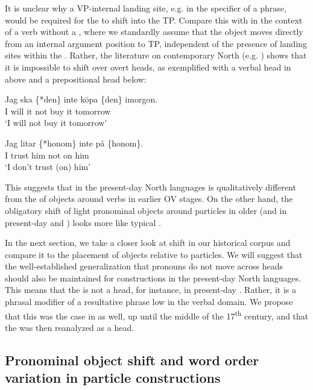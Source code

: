 \documentclass[output=paper]{langscibook}
\begin{document}
It is unclear why a VP-internal landing site, e.g. in the specifier of a  phrase, would be required for the  to shift into the TP. Compare this with  in the context of a verb without a , where we standardly assume that the object moves directly from an internal argument position to TP, independent of the presence of landing sites within the . Rather, the literature on contemporary North   (e.g. \citealt{Thrainsson2001}) shows that it is impossible to shift over overt heads, as exemplified with a verbal head in  above and a prepositional head below:


\ea\label{ex:lalu:50}
\ea
\gll Jag  ska  \{*den\}   inte   köpa   \{den\}   imorgon.\\
      I         will      it      not  buy     it     tomorrow \\
\glt  ‘I will not buy it tomorrow'

\ex
\gll Jag  litar   \{*honom\}   inte   på   \{honom\}.\\
    I     trust     him     not   on     him\\
\glt  ‘I don’t trust (on) him'
\z
\z


This suggests that  in the present-day North  languages is qualitatively different from the  of objects around verbs in earlier OV stages. On the other hand, the obligatory shift of light pronominal objects around particles in older  (and in present-day  and ) looks more like typical . 



In the next section, we take a closer look at  shift in our historical corpus and compare it to the placement of objects relative to particles. We will suggest that the well-established generalization that pronouns do not move across heads should also be maintained for  constructions in the present-day North  languages. This means that the  is not a head, for instance, in present-day . Rather, it is a phrasal modifier of a resultative phrase low in the verbal domain. We propose that this was the case in  as well, up until the middle of the 17\textsuperscript{th} century, and that the  was then reanalyzed as a head. 


\subsection{Pronominal object shift and word order variation in particle constructions}\label{sec:lalu:6.2}\largerpage
\end{document}
